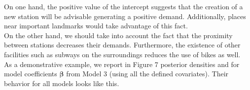\documentclass[12pt]{article}
\begin{document}
	\noindent
	On one hand, the positive value of the intercept suggests that the creation of a new station will be advisable generating a positive demand.  Additionally, places near important landmarks would take advantage of this fact.\\
	
	\noindent
	On the other hand, we should take into account the fact that the proximity between stations decreases their demands. Furthermore, the existence of other facilities such as subways on the surroundings reduces the use of bikes as well.\\
	
	\noindent
	As a demonstrative example, we report in Figure 7 posterior densities and for model coefficients $\boldsymbol{\beta}$ from Model 3 (using all the defined covariates). Their behavior for all models looks like this.
\end{document}
